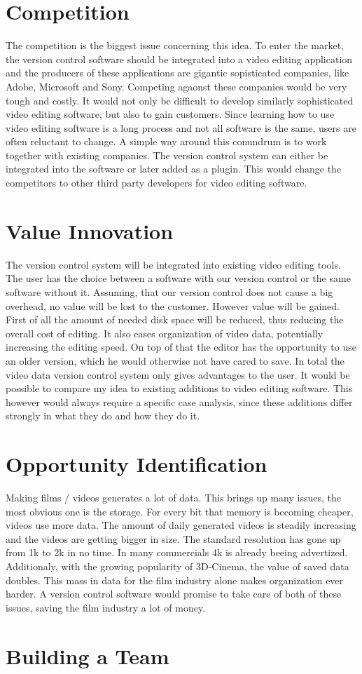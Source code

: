\documentclass{sig-alternate-05-2015}
\begin{document}
\section{Competition}
The competition is the biggest issue concerning this idea. To enter the market, the version control software should be integrated into a video editing application and the producers of these applications are gigantic sopisticated companies, like Adobe, Microsoft and Sony. Competing agaonst these companies would be very tough and costly. It would not only be difficult to develop similarly sophisticated video editing software, but also to gain customers. Since learning how to use video editing software is a long process and not all software is the same, users are often reluctant to change.
A simple way around this conundrum is to work together with existing companies. The version control system can either be integrated into the software or later added as a plugin. This would change the competitors to other third party developers for video editing software.

\section{Value Innovation}
The version control system will be integrated into existing video editing tools. The user has the choice between a software with our version control or the same software without it. Assuming, that our version control does not cause a big overhead, no value will be lost to the customer. However value will be gained. First of all the amount of needed disk space will be reduced, thus reducing the overall cost of editing. It also eases organization of video data, potentially increasing the editing speed. On top of that the editor has the opportunity to use an older version, which he would otherwise not have cared to save. In total the video data version control system only gives advantages to the user.
It would be possible to compare my idea to existing additions to video editing software. This however would always require a specific case analysis, since these additions differ strongly in what they do and how they do it.

\section{Opportunity Identification}
Making films / videos generates a lot of data. This brings up many issues, the most obvious one is the storage. For every bit that memory is becoming cheaper, videos use more data. The amount of daily generated videos is steadily increasing and the videos are getting bigger in size. The standard resolution has gone up from 1k to 2k in no time. In many commercials 4k is already beeing advertized. Additionaly, with the growing popularity of 3D-Cinema, the value of saved data doubles. This mass in data for the film industry alone makes organization ever harder.
A version control software would promise to take care of both of these issues, saving the film industry a lot of money.

\section{Building a Team}

\theendnotes
\end{document}
